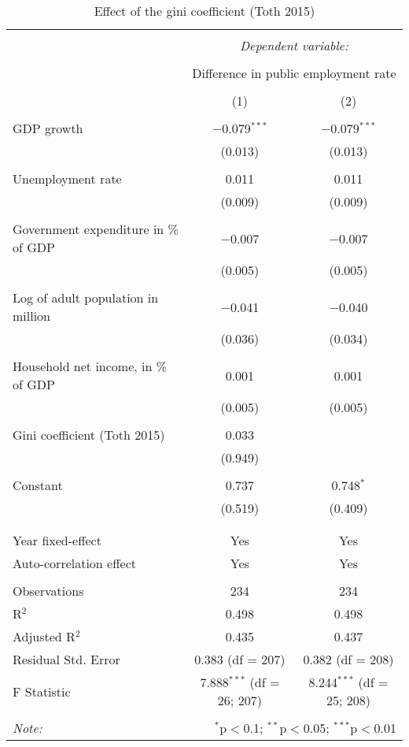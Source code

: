 
\begin{table}[!htbp] \centering 
  \caption{Effect of the gini coefficient (Toth 2015)} 
  \label{} 
\begin{tabular}{@{\extracolsep{5pt}}lcc} 
\\[-1.8ex]\hline 
\hline \\[-1.8ex] 
 & \multicolumn{2}{c}{\textit{Dependent variable:}} \\ 
\cline{2-3} 
\\[-1.8ex] & \multicolumn{2}{c}{Difference in public employment rate} \\ 
\\[-1.8ex] & (1) & (2)\\ 
\hline \\[-1.8ex] 
 GDP growth & $-$0.079$^{***}$ & $-$0.079$^{***}$ \\ 
  & (0.013) & (0.013) \\ 
  & & \\ 
 Unemployment rate & 0.011 & 0.011 \\ 
  & (0.009) & (0.009) \\ 
  & & \\ 
 Government expenditure in \% of GDP & $-$0.007 & $-$0.007 \\ 
  & (0.005) & (0.005) \\ 
  & & \\ 
 Log of adult population in million & $-$0.041 & $-$0.040 \\ 
  & (0.036) & (0.034) \\ 
  & & \\ 
 Household net income, in \% of GDP & 0.001 & 0.001 \\ 
  & (0.005) & (0.005) \\ 
  & & \\ 
 Gini coefficient (Toth 2015) & 0.033 &  \\ 
  & (0.949) &  \\ 
  & & \\ 
 Constant & 0.737 & 0.748$^{*}$ \\ 
  & (0.519) & (0.409) \\ 
  & & \\ 
\hline \\[-1.8ex] 
Year fixed-effect & Yes & Yes \\ 
Auto-correlation effect & Yes & Yes \\ 
\hline \\[-1.8ex] 
Observations & 234 & 234 \\ 
R$^{2}$ & 0.498 & 0.498 \\ 
Adjusted R$^{2}$ & 0.435 & 0.437 \\ 
Residual Std. Error & 0.383 (df = 207) & 0.382 (df = 208) \\ 
F Statistic & 7.888$^{***}$ (df = 26; 207) & 8.244$^{***}$ (df = 25; 208) \\ 
\hline 
\hline \\[-1.8ex] 
\textit{Note:}  & \multicolumn{2}{r}{$^{*}$p$<$0.1; $^{**}$p$<$0.05; $^{***}$p$<$0.01} \\ 
\end{tabular} 
\end{table} 
